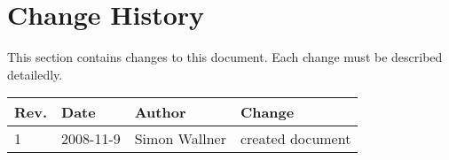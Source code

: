 \section{Change History}
This section contains changes to this document. Each change must be described detailedly.
\begin{table}[h]
\begin{tabular}{|l|l|l|l|}
\hline
\textbf{Rev.} & \textbf{Date} & \textbf{Author} & \textbf{Change} \\
\hline
1 & 2008-11-9 & Simon Wallner & created document \\
\hline
\end{tabular}
\end{table}





